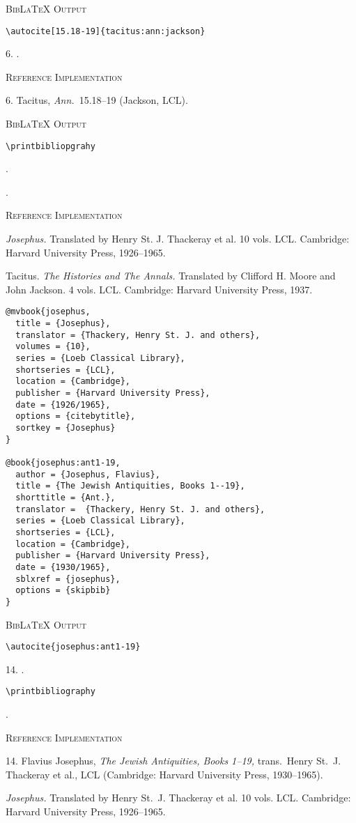 \documentclass[a4paper]{article}
\newcommand\citetestnsnpbib[3]{%
  {\textsc{BibLaTeX Output}\par
   \nobreak
   \texttt{\textbackslash autocite\{#2\}}\par
   \color{biblatex-colour}
   #1. \cite{#2}.\par
   \color{black}
   \texttt{\textbackslash printbibliography}\par
   \color{biblatex-colour}
   \hangindent\bibindent\bibentrycite{#3}.\par}}
\newenvironment{refimp}{%
  \begin{minipage}{\linewidth}
    \setlength{\parskip}{1ex}
    \textsc{Reference Implementation}\par
    \nobreak
    \color{reference-colour}
}{\end{minipage}}
\begin{document}
{\textsc{BibLaTeX Output}\par
  \nobreak
  \texttt{\textbackslash autocite[15.18-19]\{tacitus:ann:jackson\}}\par
  \color{biblatex-colour}
6. \cite[15.18-19]{tacitus:ann:jackson}.\par}

\begin{refimp}
  6. Tacitus, \emph{Ann.}\ 15.18–19 (Jackson, LCL).
\end{refimp}

{\textsc{BibLaTeX Output}\par
  \nobreak
  \texttt{\textbackslash printbibliopgrahy}\par
  \color{biblatex-colour}
\hangindent\bibindent{}.\par
\hangindent\bibindent{}.\par}

\begin{refimp}
  \hangindent\bibindent \emph{Josephus.} Translated by Henry St. J. Thackeray
  et al. 10 vols. LCL. Cambridge: Harvard University Press, 1926–1965.

  \hangindent\bibindent Tacitus. \emph{The Histories and The Annals.}
  Translated by Clifford H. Moore and John Jackson. 4 vols. LCL. Cambridge:
  Harvard University Press, 1937.
\end{refimp}

\begin{lstlisting}
@mvbook{josephus,
  title = {Josephus},
  translator = {Thackery, Henry St. J. and others},
  volumes = {10},
  series = {Loeb Classical Library},
  shortseries = {LCL},
  location = {Cambridge},
  publisher = {Harvard University Press},
  date = {1926/1965},
  options = {citebytitle},
  sortkey = {Josephus}
}

@book{josephus:ant1-19,
  author = {Josephus, Flavius},
  title = {The Jewish Antiquities, Books 1--19},
  shorttitle = {Ant.},
  translator =  {Thackery, Henry St. J. and others},
  series = {Loeb Classical Library},
  shortseries = {LCL},
  location = {Cambridge},
  publisher = {Harvard University Press},
  date = {1930/1965},
  sblxref = {josephus},
  options = {skipbib}
}
\end{lstlisting}

\citetestnsnpbib{14}{josephus:ant1-19}{josephus}

\begin{refimp}
  14. Flavius Josephus, \emph{The Jewish Antiquities, Books 1–19,} trans.\
  Henry St.\ J. Thackeray et al., LCL (Cambridge: Harvard University Press,
  1930–1965).

  \hangindent\bibindent \emph{Josephus.} Translated by Henry St.\ J. Thackeray
  et al. 10 vols. LCL. Cambridge: Harvard University Press, 1926–1965.
\end{refimp}
\end{document}
